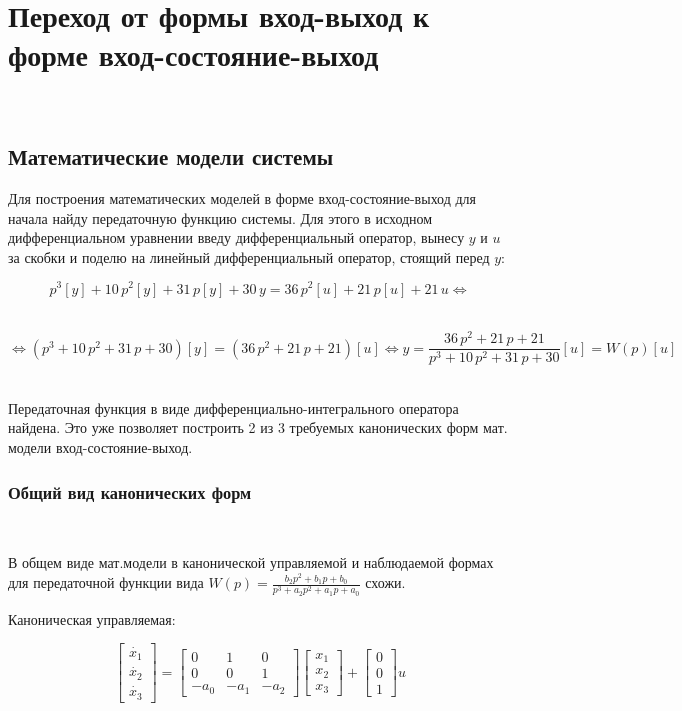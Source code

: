 \documentclass[a4paper]{article}
\begin{document}
\section{Переход от формы вход-выход к форме вход-состояние-выход}\

\subsection{Математические модели системы}

Для построения математических моделей в форме вход-состояние-выход для начала найду передаточную функцию системы. Для этого в исходном дифференциальном уравнении введу дифференциальный оператор, вынесу $y$ и $u$ за скобки и поделю на линейный дифференциальный оператор, стоящий перед $y$: 

$$
p^3[y]+10\,p^2[y]+31\,p[y] + 30\,y = 36\,p^2[u] + 21\,p[u] + 21\,u \Leftrightarrow
$$\

$$
\Leftrightarrow (p^3+10\,p^2+31\,p + 30)[y] = (36\,p^2 + 21\,p + 21)[u]\Leftrightarrow y = \frac{36\,p^2 + 21\,p + 21}{p^3+10\,p^2+31\,p + 30} [u] = W(p)[u]
$$\

Передаточная функция в виде дифференциально-интегрального оператора найдена. Это уже позволяет построить 2 из 3 требуемых канонических форм мат. модели вход-состояние-выход.\ 

\subsubsection{Общий вид канонических форм}\ 

В общем виде мат.модели в канонической управляемой и наблюдаемой формах для передаточной функции вида $W(p) = \frac{b_2p^2 + b_1p + b_0}{p^3+a_2p^2+a_1p+a_0}$ схожи.\ 

Каноническая управляемая:

$$
\begin{bmatrix}
    \dot{x_1} \\
    \dot{x_2} \\
    \dot{x_3}
\end{bmatrix} = \begin{bmatrix}
    0 & 1 & 0 \\ 
    0 & 0 & 1 \\
    -a_0 & -a_1 & -a_2
\end{bmatrix}\begin{bmatrix}
    x_1 \\
    x_2 \\
    x_3
\end{bmatrix} + \begin{bmatrix}
    0 \\ 
    0 \\ 
    1
\end{bmatrix}u
$$\
\end{document}
